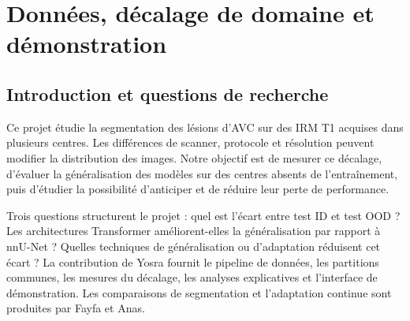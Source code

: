 
\makeatletter
\g@addto@macro\UrlBreaks{\do\_\do\-}
\makeatother
\setlength{\emergencystretch}{3em}

\chapter{Données, décalage de domaine et démonstration}
\label{chap:yosra}

\section{Introduction et questions de recherche}
\label{sec:yosra-introduction}

Ce projet étudie la segmentation des lésions d'AVC sur des IRM T1 acquises dans plusieurs centres.
Les différences de scanner, protocole et résolution peuvent modifier la distribution des images.
Notre objectif est de mesurer ce décalage, d'évaluer la généralisation des modèles sur des centres absents de l'entraînement, puis d'étudier la possibilité d'anticiper et de réduire leur perte de performance.

Trois questions structurent le projet : quel est l'écart entre test ID et test OOD ?
Les architectures Transformer améliorent-elles la généralisation par rapport à nnU-Net ?
Quelles techniques de généralisation ou d'adaptation réduisent cet écart ?
La contribution de Yosra fournit le pipeline de données, les partitions communes, les mesures du décalage, les analyses explicatives et l'interface de démonstration.
Les comparaisons de segmentation et l'adaptation continue sont produites par Fayfa et Anas.

